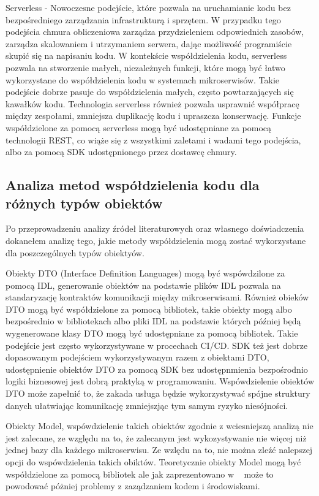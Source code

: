 \documentclass[runningheads,12pt]{llncs}
\begin{document}
Serverless - Nowoczesne podejście, które pozwala na uruchamianie kodu bez bezpośredniego zarządzania infrastrukturą i sprzętem. W przypadku tego podejścia chmura obliczeniowa zarządza przydzieleniem odpowiednich zasobów, zarządza skalowaniem i utrzymaniem serwera, dając możliwość programiście skupić się na napisaniu kodu. W kontekście współdzielenia kodu, serverless pozwala na stworzenie małych, niezależnych funkcji, które mogą być łatwo wykorzystane do współdzielenia kodu w systemach mikroserwisów. Takie podejście dobrze pasuje do współdzielenia małych, często powtarzających się kawałków kodu. Technologia serverless również pozwala usprawnić współpracę między zespołami, zmniejsza duplikację kodu i upraszcza konserwację. Funkcje współdzielone za pomocą serverless mogą być udostępniane za pomocą technologii REST, co wiąże się z wszystkimi zaletami i wadami tego podejścia, albo za pomocą SDK udostępnionego przez dostawcę chmury.

\subsection{Analiza metod współdzielenia kodu dla różnych typów obiektów}

Po przeprowadzeniu analizy źródeł literaturowych oraz własnego doświadczenia dokanełem analizę tego, jakie metody współdzielenia mogą zostać wykorzystane dla poszczególnych typów obiektyów.

Obiekty DTO (Interface Definition Languages) mogą być wspówdzilone za pomocą IDL, generowanie obiektów na podstawie plików IDL pozwala na standaryzację kontraktów komunikacji między mikroserwisami. Również obieków DTO mogą być współdzielone za pomocą bibliotek, takie obiekty mogą albo bezpośrednio w bibliotekach albo pliki IDL na podstawie których później będą wygenerowane klasy DTO mogą być udostępniane za pomocą bibliotek. Takie podejście jest często wykorzystywane w procechach CI/CD. SDK też jest dobrze dopasowanym podejściem wykorzystywanym razem z obiektami DTO, udostępnienie obiektów DTO za pomocą SDK bez udostępnmienia bezpośrodnio logiki biznesowej jest dobrą praktyką w programowaniu. Wspówdzielenie obiektów DTO może zapełnić to, że zakada usługa będzie wykorzystywać spójne struktury danych ułatwiając komunikację zmniejszjąc tym samym ryzyko niesójności.

Obiekty Model, wspówdzielenie takich obiektów zgodnie z wciesniejszą analizą nie jest zalecane, ze względu na to, że zalecanym jest wykozystywanie nie więcej niż jednej bazy dla każdego mikroserwisu. Ze wzlędu na to, nie można zleźć nalepszej opcji do wspówdzielenia takich obiktów. Teoretycznie obiekty Model mogą być współdzielone za pomocą bibliotek ale jak zaprezentowano w ~\cite{bhuyan2020microservices} może to powodować póżniej problemy z zaządzaniem kodem i środowiskami.
\end{document}
